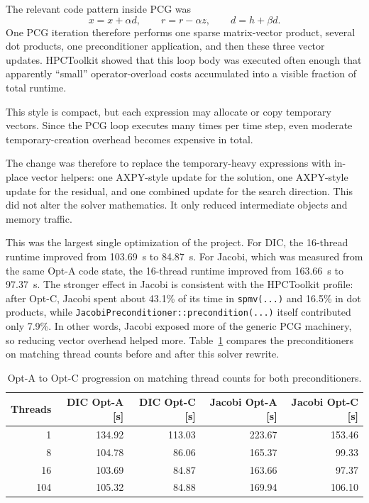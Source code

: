 \documentclass[10pt,firstlineindent,nopartpage,article,accentcolor=tud1b]{tudreport}
\begin{document}
The relevant code pattern inside PCG was
\begin{equation*}
x = x + \alpha d,\qquad
r = r - \alpha z,\qquad
d = h + \beta d.
\end{equation*}
One PCG iteration therefore performs one sparse matrix-vector product, several
dot products, one preconditioner application, and then these three vector
updates. HPCToolkit showed that this loop body was executed often enough that
apparently ``small'' operator-overload costs accumulated into a visible
fraction of total runtime.

This style is compact, but each expression may allocate or copy temporary
vectors. Since the PCG loop executes many times per time step, even moderate
temporary-creation overhead becomes expensive in total.

The change was therefore to replace the temporary-heavy expressions with
in-place vector helpers: one AXPY-style update for the solution, one
AXPY-style update for the residual, and one combined update for the search
direction. This did not alter the solver mathematics. It only reduced
intermediate objects and memory traffic.

This was the largest single optimization of the project. For DIC, the 16-thread
runtime improved from \SI{103.69}{s} to \SI{84.87}{s}. For Jacobi, which was
measured from the same Opt-A code state, the 16-thread runtime improved from
\SI{163.66}{s} to \SI{97.37}{s}. The stronger effect in Jacobi is consistent
with the HPCToolkit profile: after Opt-C, Jacobi spent about 43.1\% of its time
in \texttt{spmv(...)} and 16.5\% in dot products, while
\texttt{JacobiPreconditioner::precondition(...)} itself contributed only 7.9\%.
In other words, Jacobi exposed more of the generic PCG machinery, so reducing
vector overhead helped more. Table~\ref{tab:optac-compare} compares the
preconditioners on matching thread counts before and after this solver rewrite.

\begin{table}[H]
\centering
\caption{Opt-A to Opt-C progression on matching thread counts for both preconditioners.}
\label{tab:optac-compare}
\begin{tabular}{rrrrr}
\toprule
Threads & DIC Opt-A [s] & DIC Opt-C [s] & Jacobi Opt-A [s] & Jacobi Opt-C [s] \\
\midrule
1   & 134.92 & 113.03 & 223.67 & 153.46 \\
8   & 104.78 & 86.06  & 165.37 & 99.33  \\
16  & 103.69 & 84.87  & 163.66 & 97.37  \\
104 & 105.32 & 84.88  & 169.94 & 106.10 \\
\bottomrule
\end{tabular}
\end{table}
\end{document}
